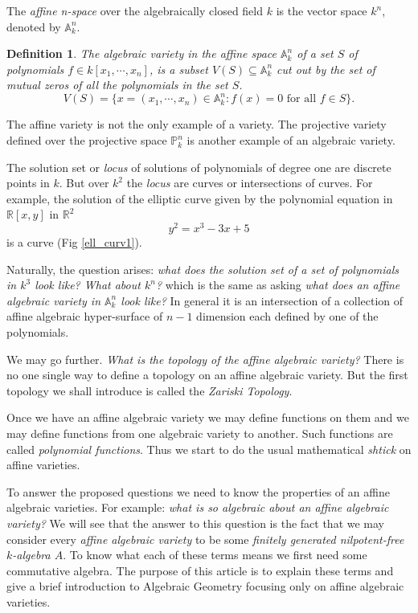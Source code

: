 \documentclass[]{report}
\newtheorem{defn}[theorem]{Definition}
\begin{document}
The \textit{affine n-space} over the algebraically closed field $k$ is the vector space $k^n$, denoted by $\mathbb{A}^n_k$.

\begin{defn} The algebraic variety \cite{vakil145} in the affine space $\mathbb{A}^n_k$ of a set $S$ of polynomials $f\in k[x_1,\cdots, x_n]$, is a subset $V(S)\subseteq \mathbb{A}^n_k$ cut out by the set of mutual zeros of all the polynomials in the set $S$.  
    $$V(S) = \{x = (x_1,\cdots,x_n) \in \mathbb{A}^n_k : f(x) = 0 \text{ for all } f \in S\}.$$
\end{defn}

The affine variety is not the only example of a variety. The projective variety defined over the projective space $\mathbb{P}^n_k$ is another example of an algebraic variety.

The solution set or \textit{locus} of solutions of polynomials of degree one are discrete points in $k$. But over $k^2$ the \textit{locus} are curves or intersections of curves. For example, the solution of the elliptic curve given by the polynomial equation in $\mathbb{R}[x,y]$ in $\mathbb{R}^2$  
    $$y^2 = x^3 - 3x + 5$$
    is a curve (Fig \ref{ell_curv1}).

    Naturally, the question arises: \textit{what does the solution set of a set of polynomials in $k^3$ look like? What about $k^n$?} which is the same as asking \textit{what does an affine algebraic variety in $\mathbb{A}^n_k$ look like?} In general it is an intersection of a collection of affine algebraic hyper-surface of $n-1$ dimension each defined by one of the polynomials.

    We may go further. \textit{What is the topology of the affine algebraic variety?} There is no one single way to define a topology on an affine algebraic variety. But the first topology we shall introduce is called the \textit{Zariski Topology}.

    Once we have an affine algebraic variety we may define functions on them and we may define functions from one algebraic variety to another. Such functions are called \textit{polynomial functions}. Thus we start to do the usual mathematical \textit{shtick} on affine varieties.

    To answer the proposed questions we need to know the properties of an affine algebraic varieties. For example: \textit{what is so algebraic about an affine algebraic variety?} We will see that the answer to this question is the fact that we may consider every \textit{affine algebraic variety} to be some \textit{finitely generated nilpotent-free $k$-algebra $A$}. To know what each of these terms means we first need some commutative algebra. The purpose of this article is to explain these terms and give a brief introduction to Algebraic Geometry focusing only on affine algebraic varieties.
\end{document}
